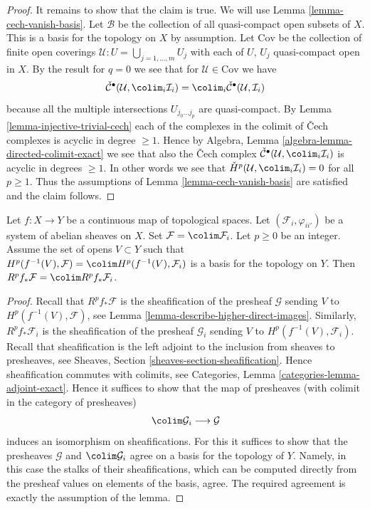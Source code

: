 \begin{proof}
\medskip\noindent
It remains to show that the claim is true. We will use
Lemma \ref{lemma-cech-vanish-basis}.
Let $\mathcal{B}$ be the collection of all quasi-compact open
subsets of $X$. This is a basis for the topology on $X$ by assumption.
Let $\text{Cov}$ be the collection of finite open coverings
$\mathcal{U} : U = \bigcup_{j = 1, \ldots, m} U_j$ with each
of $U$, $U_j$ quasi-compact open in $X$. By the result for $q = 0$
we see that for $\mathcal{U} \in \text{Cov}$ we have
$$
\check{\mathcal{C}}^\bullet(\mathcal{U}, \colim_i \mathcal{I}_i)
=
\colim_i \check{\mathcal{C}}^\bullet(\mathcal{U}, \mathcal{I}_i)
$$
because all the multiple intersections $U_{j_0 \ldots j_p}$
are quasi-compact. By Lemma \ref{lemma-injective-trivial-cech}
each of the complexes in the colimit of {\v C}ech complexes is
acyclic in degree $\geq 1$. Hence by
Algebra, Lemma \ref{algebra-lemma-directed-colimit-exact}
we see that also the {\v C}ech complex
$\check{\mathcal{C}}^\bullet(\mathcal{U}, \colim_i \mathcal{I}_i)$
is acyclic in degrees $\geq 1$. In other words we see that
$\check{H}^p(\mathcal{U},  \colim_i \mathcal{I}_i) = 0$
for all $p \geq 1$. Thus the assumptions of
Lemma \ref{lemma-cech-vanish-basis} are satisfied and the claim follows.
\end{proof}

\begin{lemma}
\label{lemma-higher-direct-image-colimit}
Let $f : X \to Y$ be a continuous map of topological spaces.
Let $(\mathcal{F}_i, \varphi_{ii'})$ be a system of
abelian sheaves on $X$. Set $\mathcal{F} = \colim \mathcal{F}_i$.
Let $p \geq 0$ be an integer. Assume the set of opens $V \subset Y$ such that
$H^p(f^{-1}(V), \mathcal{F}) = \colim H^p(f^{-1}(V), \mathcal{F}_i)$
is a basis for the topology on $Y$. Then
$R^pf_*\mathcal{F} = \colim R^pf_*\mathcal{F}_i$.
\end{lemma}

\begin{proof}
Recall that $R^pf_*\mathcal{F}$ is the sheafification of the presheaf
$\mathcal{G}$ sending $V$ to $H^p(f^{-1}(V), \mathcal{F})$, see
Lemma \ref{lemma-describe-higher-direct-images}. Similarly,
$R^pf_*\mathcal{F}_i$ is the sheafification of the presheaf
$\mathcal{G}_i$ sending $V$ to $H^p(f^{-1}(V), \mathcal{F}_i)$.
Recall that sheafification is the left adjoint to the inclusion
from sheaves to presheaves, see Sheaves, Section
\ref{sheaves-section-sheafification}. Hence sheafification commutes
with colimits, see Categories, Lemma \ref{categories-lemma-adjoint-exact}.
Hence it suffices to show that the map of presheaves (with colimit
in the category of presheaves)
$$
\colim \mathcal{G}_i \longrightarrow \mathcal{G}
$$
induces an isomorphism on sheafifications. For this it suffices to show
that the presheaves $\mathcal{G}$ and $\colim \mathcal{G}_i$
agree on a basis for the topology of $Y$. Namely, in this case the stalks
of their sheafifications, which can be computed directly from the
presheaf values on elements of the basis, agree.
The required agreement is exactly the assumption of the lemma.
\end{proof}

